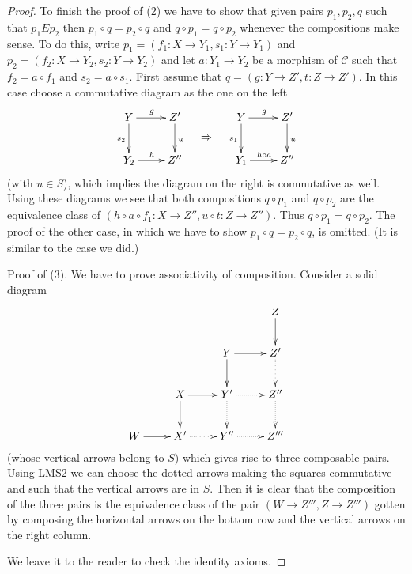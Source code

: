 \begin{proof}
\medskip\noindent
To finish the proof of (2) we have to show that given pairs
$p_1, p_2, q$ such that $p_1Ep_2$ then $p_1 \circ q = p_2 \circ q$ and
$q \circ p_1 = q \circ p_2$ whenever the compositions make sense.
To do this, write $p_1 = (f_1 : X \to Y_1, s_1 : Y \to Y_1)$ and
$p_2 = (f_2 : X \to Y_2, s_2 : Y \to Y_2)$ and let
$a : Y_1 \to Y_2$ be a morphism of $\mathcal{C}$ such that
$f_2 = a \circ f_1$ and $s_2 = a \circ s_1$.
First assume that $q = (g : Y \to Z', t : Z \to Z')$.
In this case choose a commutative diagram as the one on the left
$$
\vcenter{
\xymatrix{
Y \ar[d]_{s_2} \ar[r]^g & Z' \ar[d]^u \\
Y_2 \ar[r]^h & Z''
}
}
\quad
\Rightarrow
\quad
\vcenter{
\xymatrix{
Y \ar[d]_{s_1} \ar[r]^g & Z' \ar[d]^u \\
Y_1 \ar[r]^{h \circ a} & Z''
}
}
$$
(with $u \in S$),
which implies the diagram on the right is commutative as well.
Using these diagrams we see that both compositions $q \circ p_1$
and $q \circ p_2$ are the equivalence class of
$(h \circ a \circ f_1 : X \to Z'', u \circ t : Z \to Z'')$.
Thus $q \circ p_1 = q \circ p_2$.
The proof of the other case, in which we have to show
$p_1 \circ q = p_2 \circ q$, is omitted. (It is similar to the
case we did.)

\medskip\noindent
Proof of (3). We have to prove associativity of composition.
Consider a solid diagram
$$
\xymatrix{
& & & Z \ar[d] \\
& & Y \ar[d] \ar[r] & Z' \ar@{..>}[d] \\
& X \ar[d] \ar[r] & Y' \ar@{..>}[d] \ar@{..>}[r] & Z'' \ar@{..>}[d] \\
W \ar[r] & X' \ar@{..>}[r] & Y'' \ar@{..>}[r] & Z'''
}
$$
(whose vertical arrows belong to $S$)
which gives rise to three composable pairs.
Using LMS2 we can choose the dotted arrows making the squares commutative
and such that the vertical arrows are in $S$.
Then it is clear that the composition of the three pairs
is the equivalence class of the pair
$(W \to Z''', Z \to Z''')$ gotten by composing the
horizontal arrows on the bottom row and the vertical arrows
on the right column.

\medskip\noindent
We leave it to the reader to check the identity axioms.
\end{proof}

